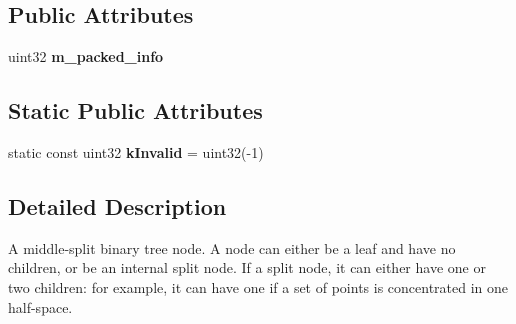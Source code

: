 \subsection*{\-Public \-Attributes}
\begin{DoxyCompactItemize}
\item 
\hypertarget{structnih_1_1_bintree__node_ac2ec850a714d07a65e110c19a4acc7d9}{
uint32 {\bfseries m\-\_\-packed\-\_\-info}}
\label{structnih_1_1_bintree__node_ac2ec850a714d07a65e110c19a4acc7d9}

\end{DoxyCompactItemize}
\subsection*{\-Static \-Public \-Attributes}
\begin{DoxyCompactItemize}
\item 
\hypertarget{structnih_1_1_bintree__node_ad9537d28156e22422450c58aec8b6f5d}{
static const uint32 {\bfseries k\-Invalid} = uint32(-\/1)}
\label{structnih_1_1_bintree__node_ad9537d28156e22422450c58aec8b6f5d}

\end{DoxyCompactItemize}


\subsection{\-Detailed \-Description}
\-A middle-\/split binary tree node. \-A node can either be a leaf and have no children, or be an internal split node. \-If a split node, it can either have one or two children\-: for example, it can have one if a set of points is concentrated in one half-\/space. 


